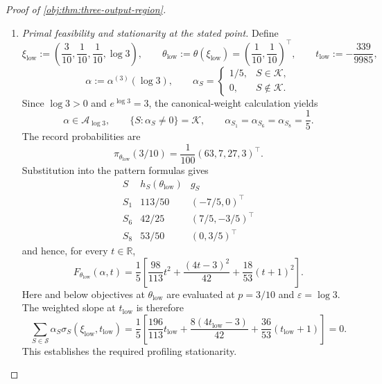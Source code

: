 \begin{proof}[Proof of \cref{obj:thm:three-output-region}]
\begin{enumerate}
\item \textit{Primal feasibility and stationarity at the stated point.}
Define
\[
\xi_{\mathrm{low}}
:=
\left(\frac3{10},\frac1{10},\frac1{10},\log3\right),
\qquad
\theta_{\mathrm{low}}:=\theta(\xi_{\mathrm{low}})
=\left(\frac1{10},\frac1{10}\right)^\top,
\qquad
t_{\mathrm{low}}:=-\frac{339}{9985},
\]
\[
\alpha:=\alpha^{(3)}(\log3),
\qquad
\alpha_S=
\begin{cases}
1/5,&S\in\mathcal K,\\
0,&S\notin\mathcal K.
\end{cases}
\]
Since \(\log3>0\) and \(e^{\log3}=3\), the canonical-weight calculation yields
\[
\alpha\in\mathcal A_{\log3},
\qquad
\{S:\alpha_S\ne0\}=\mathcal K,
\qquad
\alpha_{S_1}=\alpha_{S_6}=\alpha_{S_8}=\frac15.
\]
The record probabilities are
\[
\pi_{\theta_{\mathrm{low}}}(3/10)
=\frac1{100}(63,7,27,3)^\top.
\]
Substitution into the pattern formulas gives
\[
\begin{array}{c|c|c}
S&h_S(\theta_{\mathrm{low}})&g_S\\ \hline
S_1&113/50&(-7/5,0)^\top\\
S_6&42/25&(7/5,-3/5)^\top\\
S_8&53/50&(0,3/5)^\top
\end{array}
\]
and hence, for every \(t\in\mathbb R\),
\[
F_{\theta_{\mathrm{low}}}(\alpha,t)
=
\frac15\left[
\frac{98}{113}t^2
+\frac{(4t-3)^2}{42}
+\frac{18}{53}(t+1)^2
\right].
\]
Here and below objectives at \(\theta_{\mathrm{low}}\) are evaluated at \(p=3/10\) and \(\varepsilon=\log3\). The weighted slope at \(t_{\mathrm{low}}\) is therefore
\[
\sum_{S\in\mathcal S}\alpha_S
\sigma_S(\xi_{\mathrm{low}},t_{\mathrm{low}})
=
\frac15\left[
\frac{196}{113}t_{\mathrm{low}}
+\frac{8(4t_{\mathrm{low}}-3)}{42}
+\frac{36}{53}(t_{\mathrm{low}}+1)
\right]
=0.
\]
This establishes the required profiling stationarity.


\end{enumerate}
\end{proof}
